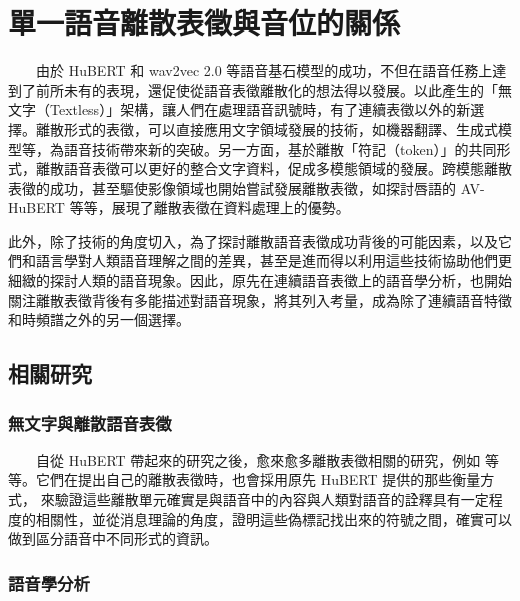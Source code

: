 
\chapter{單一語音離散表徵與音位的關係}  %

　　由於 HuBERT 和 wav2vec 2.0 等語音基石模型的成功，不但在語音任務上達到了前所未有的表現，還促使從語音表徵離散化的想法得以發展。以此產生的「無文字（Textless）」架構，讓人們在處理語音訊號時，有了連續表徵以外的新選擇。離散形式的表徵，可以直接應用文字領域發展的技術，如機器翻譯、生成式模型等，為語音技術帶來新的突破。另一方面，基於離散「符記（token）」的共同形式，離散語音表徵可以更好的整合文字資料，促成多模態領域的發展。跨模態離散表徵的成功，甚至驅使影像領域也開始嘗試發展離散表徵，如探討唇語的 AV-HuBERT \cite{shi2021learning} 等等，展現了離散表徵在資料處理上的優勢。  %

        此外，除了技術的角度切入，為了探討離散語音表徵成功背後的可能因素，以及它們和語言學對人類語音理解之間的差異，甚至是進而得以利用這些技術協助他們更細緻的探討人類的語音現象。因此，原先在連續語音表徵上的語音學分析，也開始關注離散表徵背後有多能描述對語音現象，將其列入考量，成為除了連續語音特徵和時頻譜之外的另一個選擇。

\section{相關研究}

\subsection{無文字與離散語音表徵}

　　自從 HuBERT 帶起來的研究之後，愈來愈多離散表徵相關的研究，例如  等等。它們在提出自己的離散表徵時，也會採用原先 HuBERT 提供的那些衡量方式，
來驗證這些離散單元確實是與語音中的內容與人類對語音的詮釋具有一定程度的相關性，並從消息理論的角度，證明這些偽標記找出來的符號之間，確實可以做到區分語音中不同形式的資訊。

\subsection{語音學分析}

